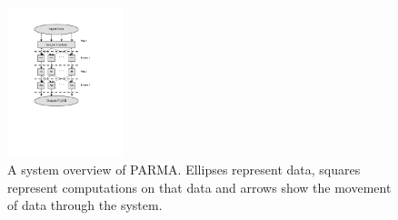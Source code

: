 \begin{figure}[htb]
\centering
\includegraphics[width=0.3\textwidth]{parma/overview.pdf}
\caption{A system overview of PARMA. Ellipses represent data, squares represent
computations on that data and arrows show the movement of data through the
system.}
\label{fig:overview}
\end{figure}

